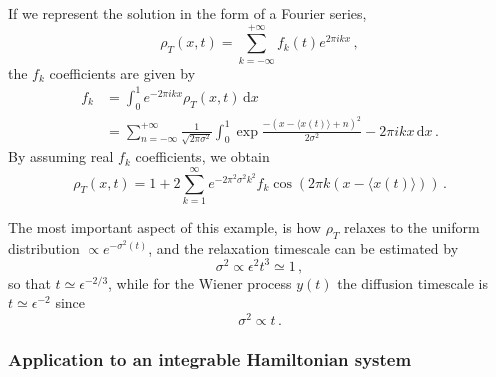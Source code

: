 If we represent the solution in the form of a Fourier series,
\begin{equation}
	\rho_T(x,t) = \sum_{k=-\infty}^{+\infty} f_k(t)e^{2\pi i k x} \,,
\end{equation}
the \(f_k\) coefficients are given by
\begin{align}
	f_k &= \int_0^1 e^{-2\pi i k x} \rho_T(x,t)\,\mathrm{d}x \\
	&= \sum_{n=-\infty}^{+\infty} \frac{1}{\sqrt{2\pi\sigma^2}} \int_0^1 \exp{\frac{-(x-\langle x(t) \rangle + n)^2}{2\sigma^2} -2\pi i k x}\,\mathrm{d}x \,.
\end{align}
By assuming real \(f_k\) coefficients, we obtain
\begin{equation}
	\rho_T(x,t) = 1+2\sum_{k=1}^\infty e^{-2\pi^2\sigma^2k^2} f_k \cos(2\pi k (x-\langle x(t) \rangle)) \,.
\end{equation}

The most important aspect of this example, is how \(\rho_T\) relaxes to the uniform distribution \(\propto e^{-\sigma^2(t)}\), and the relaxation timescale can be estimated by
\begin{equation}
	\sigma^2 \propto \epsilon^2 t^{3}\simeq 1 \,,
\end{equation}
so that $t\simeq \epsilon^{-2/3}$,
while for the Wiener process $y(t)$ the diffusion timescale is $t\simeq \epsilon^{-2}$ since
\begin{equation}
	\sigma^2 \propto t \,.
\end{equation}

\subsubsection*{Application to an integrable Hamiltonian system}

